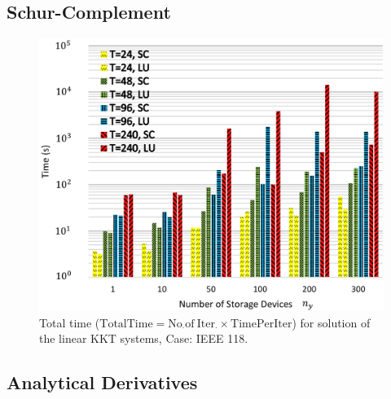\documentclass[aspectratio=169]{beamer}
\begin{document}
\subsection{Schur-Complement}
\begin{frame}
\begin{figure}[!htbp]
\centering
\includegraphics[width=3.0 in , height=2.5 in]{Figures/SCLU118Bus.png}
\caption{Total time ($\mathrm{TotalTime= No_{\cdot} of \ Iter_{\cdot} \times TimePerIter}$) for solution of the linear KKT systems, Case: IEEE 118.}
\label{118bus}
\end{figure}
\end{frame}



\subsection{Analytical Derivatives}
\end{document}
